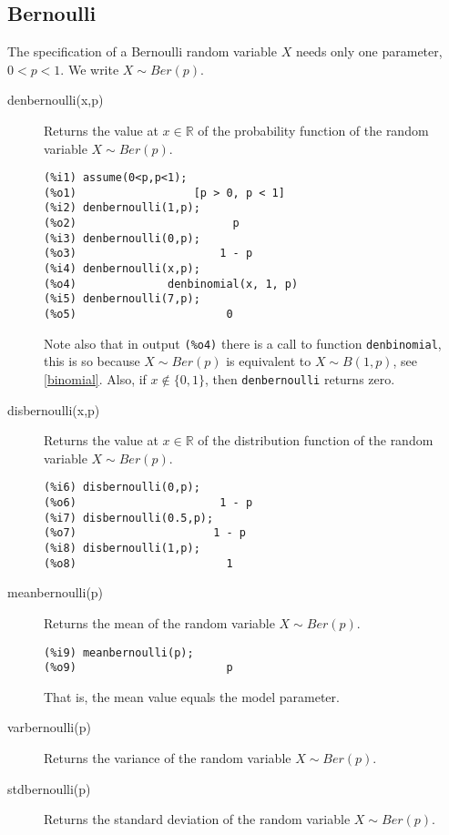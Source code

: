\documentclass[12pt,a4paper]{article}
\newcommand{\R}{\mathbb{R}}
\begin{document}
\subsection{Bernoulli}

The specification of a Bernoulli random variable $X$ needs only one parameter,  $0 <p<1$. We write $X \sim Ber(p)$.

\begin{description}

\item[denbernoulli(x,p)] Returns the value at $x \in \R$ of the probability function of the random variable $X \sim Ber(p)$.

\begin{verbatim}
(%i1) assume(0<p,p<1);
(%o1)                  [p > 0, p < 1]
(%i2) denbernoulli(1,p);
(%o2)                        p
(%i3) denbernoulli(0,p);
(%o3)                      1 - p
(%i4) denbernoulli(x,p);
(%o4)              denbinomial(x, 1, p)
(%i5) denbernoulli(7,p);
(%o5)                       0
\end{verbatim}
Note also that in output \verb|(%o4)| there is a call to function \verb|denbinomial|, this is so because $X \sim Ber(p)$ is equivalent to $X \sim B(1,p)$, see \ref{binomial}. Also, if $x \notin \{0,1\}$, then \verb|denbernoulli| returns zero.

\item[disbernoulli(x,p)] Returns the value at $x \in \R$ of the distribution function of the random variable $X \sim Ber(p)$.

\begin{verbatim}
(%i6) disbernoulli(0,p);
(%o6)                      1 - p
(%i7) disbernoulli(0.5,p);
(%o7)                     1 - p
(%i8) disbernoulli(1,p);
(%o8)                       1
\end{verbatim}

\item[meanbernoulli(p)] Returns the mean of the random variable  $X \sim Ber(p)$.

\begin{verbatim}
(%i9) meanbernoulli(p);
(%o9)                       p
\end{verbatim}
That is, the mean value equals the model parameter.

\item[varbernoulli(p)] Returns the variance of the random variable  $X \sim Ber(p)$.

\item[stdbernoulli(p)] Returns the standard deviation of the random variable  $X \sim Ber(p)$.


\end{description}
\end{document}
